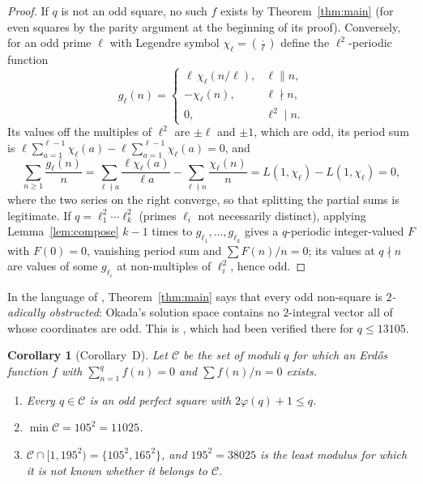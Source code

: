 \documentclass[11pt]{amsart}
\newtheorem{corollary}[theorem]{Corollary}
\theoremstyle{definition}
\theoremstyle{remark}
\numberwithin{equation}{section}
\begin{document}
\begin{proof}
If $q$ is not an odd square, no such $f$ exists by Theorem~\ref{thm:main} (for even squares by the parity argument at the beginning of its proof).
Conversely, for an odd prime $\ell$ with Legendre symbol $\chi_\ell=(\frac{\cdot}{\ell})$ define the $\ell^2$-periodic function
\[
g_\ell(n)=\begin{cases}\ell\,\chi_\ell(n/\ell),& \ell\parallel n,\\ -\chi_\ell(n),&\ell\nmid n,\\ 0,&\ell^2\mid n.\end{cases}
\]
Its values off the multiples of $\ell^2$ are $\pm\ell$ and $\pm1$, which are odd, its period sum is $\ell\sum_{a=1}^{\ell-1}\chi_\ell(a)-\ell\sum_{a=1}^{\ell-1}\chi_\ell(a)=0$, and
\[
\sum_{n\ge1}\frac{g_\ell(n)}n=\sum_{\ell\nmid a}\frac{\ell\chi_\ell(a)}{\ell a}-\sum_{\ell\nmid n}\frac{\chi_\ell(n)}n=L(1,\chi_\ell)-L(1,\chi_\ell)=0,
\]
where the two series on the right converge, so that splitting the partial sums is legitimate.
If $q=\ell_1^2\cdots\ell_k^2$ (primes $\ell_i$ not necessarily distinct), applying Lemma~\ref{lem:compose} $k-1$ times to $g_{\ell_1},\dots,g_{\ell_k}$ gives a $q$-periodic integer-valued $F$ with $F(0)=0$, vanishing period sum and $\sum F(n)/n=0$; its values at $q\nmid n$ are values of some $g_{\ell_i}$ at non-multiples of $\ell_i^2$, hence odd.
\end{proof}

In the language of \cite{Kei26}, Theorem~\ref{thm:main} says that every odd non-square is \emph{$2$-adically obstructed}: Okada's solution space contains no $2$-integral vector all of whose coordinates are odd.
This is \cite[Conj.~5.3]{Kei26}, which had been verified there for $q\le13105$.

\begin{corollary}[Corollary~D]\label{cor:picture}
Let $\mathcal C$ be the set of moduli $q$ for which an Erd\H{o}s function $f$ with $\sum_{n=1}^qf(n)=0$ and $\sum f(n)/n=0$ exists.
\begin{enumerate}
\item Every $q\in\mathcal C$ is an odd perfect square with $2\varphi(q)+1\le q$.
\item $\min\mathcal C=105^2=11025$.
\item $\mathcal C\cap[1,195^2)=\{105^2,165^2\}$, and $195^2=38025$ is the least modulus for which it is not known whether it belongs to $\mathcal C$.
\end{enumerate}
\end{corollary}
\end{document}
